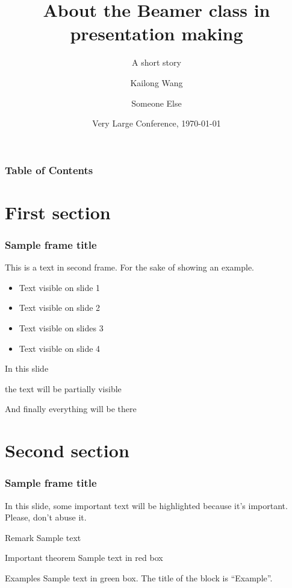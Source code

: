 \documentclass[11pt]{../formats/RU}
\title[About Beamer]{About the Beamer class in presentation making}
\subtitle{A short story}
\author[Kai] %
{Kailong Wang\inst{1} \and Someone Else\inst{2}}
\institute[Rutgers] %
{
  \inst{1}%
  Faculty of ECE\\
  Very Famous University
  \and
  \inst{2}%
  Faculty of Statistics\\
  Very Famous University
}
\date[\today] %
{Very Large Conference, \today}
\begin{document}
\frame{\titlepage}

\begin{frame}
\frametitle{Table of Contents}
\tableofcontents
\end{frame}


\section{First section}

\begin{frame}
\frametitle{Sample frame title}
This is a text in second frame. For the sake of showing an example.

\begin{itemize}
    \item<1-> Text visible on slide 1
    \item<2-> Text visible on slide 2
    \item<3> Text visible on slides 3
    \item<4-> Text visible on slide 4
\end{itemize}
\end{frame}



\begin{frame}
In this slide \pause

the text will be partially visible \pause

And finally everything will be there
\end{frame}

\section{Second section}

\begin{frame}
\frametitle{Sample frame title}

In this slide, some important text will be
\alert{highlighted} because it's important.
Please, don't abuse it.

\begin{block}{Remark}
Sample text
\end{block}

\begin{alertblock}{Important theorem}
Sample text in red box
\end{alertblock}

\begin{exampleblock}{Examples}
Sample text in green box. The title of the block is ``Example''.
\end{exampleblock}
\end{frame}
\end{document}
